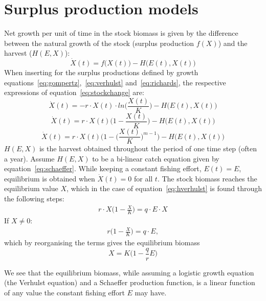 \documentclass[11pt,fleqn]{book} %
\begin{document}
\section{Surplus production models}
Net growth per unit of time in the stock biomass is given by the difference between the natural growth of the stock (surplus production $f(X)$) and the harvest ($H(E,X)$): 
\begin{equation} 
\label{eq:stockchange}
\dot{X}(t) = f\big(X(t)\big) - H\big(E(t),X(t)\big)
\end{equation}
When inserting for the surplus productions defined by growth equations~\ref{eq:gompertz},~\ref{eq:verhulst} and~\ref{eq:richards}, the respective expressions of equation~\ref{eq:stockchange} are:
\begin{equation} 
\label{eq:hgompertz}
\dot{X}(t) = - r \cdot X(t) \cdot ln\Big(\frac{X(t)}{K}\Big) - H\big(E(t),X(t)\big)
\end{equation}
\begin{equation}
\label{eq:hverhulst}
\dot{X}(t) = r \cdot X(t) \Big(1 - \frac{X(t)}{K}\Big) - H\big(E(t),X(t)\big)
\end{equation}
\begin{equation}
\label{eq:hrichards}
\dot{X}(t) = r \cdot X(t) \bigg( 1 - \bigg(\frac{X(t)}{K}\bigg)^{m - 1} \bigg) - H\big(E(t),X(t)\big)
\end{equation}
$H(E,X)$ is the harvest obtained throughout the period of one time step (often a year). Assume $H(E,X)$ to be a bi-linear catch equation given by equation~\ref{eq:schaeffer}. While keeping a constant fishing effort, $E(t) = E$, equilibrium is obtained when $\dot{X}(t) = 0$ for all $t$. The stock biomass reaches the equilibrium value $X$, which in the case of equation~\ref{eq:hverhulst} is found through the following steps:
\begin{align*}
r \cdot X \Big(1 - \frac{X}{K}\Big) = q \cdot E \cdot X
\end{align*}
If $X \neq 0$:
\begin{align*}
r \Big(1 - \frac{X}{K}\Big) = q \cdot E,
\end{align*}
which by reorganising the terms gives the equilibrium biomass
\begin{equation}
\label{eq:stockeq}
X = K \Big(1 - \frac{q}{r} E\Big)
\end{equation}

We see that the equilibrium biomass, while assuming a logistic growth equation (the Verhulst equation) and a Schaeffer production function, is a linear function of any value the constant fishing effort $E$ may have.
\end{document}
